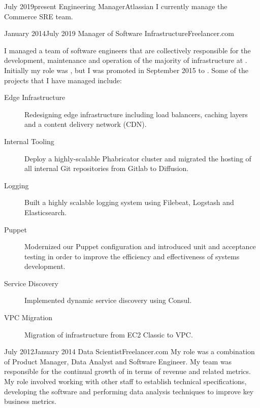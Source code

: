 \begin{professionalExperience}

\professionalExperienceItem
{July 2019}{present}
{Engineering Manager}{Atlassian}
{I currently manage the Commerce SRE team.}

\professionalExperienceItem
{January 2014}{July 2019}
{Manager of Software Infrastructure}{Freelancer.com}
{
  I managed a team of software engineers that are collectively
  responsible for the development, maintenance and operation of the majority of
  infrastructure at . Initially my role was
  , but I was promoted in September
  2015 to . Some of the projects
  that I have managed include:

  \begin{description}
    \item[Edge Infrastructure] Redesigning edge infrastructure including load
      balancers, caching layers and a content delivery network (CDN).
    \item[Internal Tooling] Deploy a highly-scalable Phabricator cluster and
      migrated the hosting of all internal Git repositories from Gitlab to
      Diffusion.
    \item[Logging] Built a highly scalable logging system using Filebeat,
      Logstash and Elasticsearch.
    \item[Puppet] Modernized our Puppet configuration and introduced unit and
      acceptance testing in order to improve the efficiency and effectiveness of
      systems development.
    \item[Service Discovery] Implemented dynamic service discovery using Consul.
    \item[VPC Migration] Migration of infrastructure from EC2 Classic to VPC\@.
  \end{description}
}

\professionalExperienceItem
{July 2012}{January 2014}
{Data Scientist}{Freelancer.com}
{
  My role was a combination of Product Manager, Data Analyst and Software
  Engineer. My team was responsible for the continual growth of
   in terms of revenue and related metrics. My role
  involved working with other staff to establish technical specifications,
  developing the software and performing data analysis techniques to improve key
  business metrics.
}

\end{professionalExperience}
